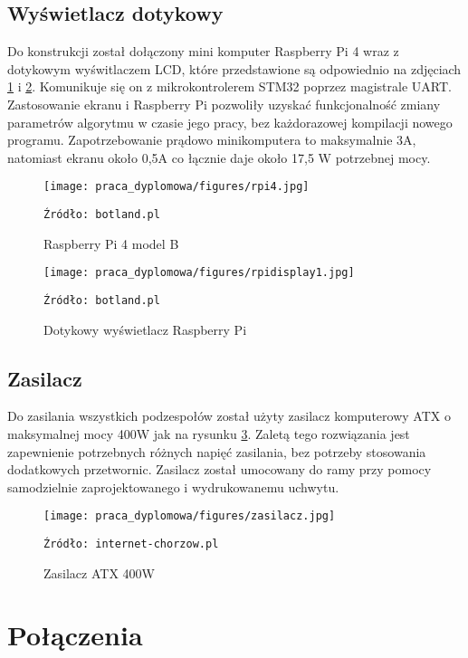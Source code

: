 \subsection{Wyświetlacz dotykowy}
Do konstrukcji został dołączony mini komputer Raspberry Pi 4 wraz z dotykowym wyświtlaczem LCD, które przedstawione są odpowiednio na zdjęciach \ref{fig:rpi4} i \ref{fig:rpidisp1}. Komunikuje się on z mikrokontrolerem STM32 poprzez magistrale UART. Zastosowanie ekranu i Raspberry Pi pozwoliły uzyskać funkcjonalność zmiany parametrów algorytmu w czasie jego pracy, bez każdorazowej kompilacji nowego programu. Zapotrzebowanie prądowo minikomputera to maksymalnie 3A, natomiast ekranu około 0,5A co łącznie daje około 17,5 W potrzebnej mocy. 

\begin{figure}
    \centering
    \texttt{[image: praca\_dyplomowa/figures/rpi4.jpg]}
    \caption{Raspberry Pi 4 model B}
    \texttt{Źródło: botland.pl}
    \label{fig:rpi4}
\end{figure}

\begin{figure}
    \centering
    \texttt{[image: praca\_dyplomowa/figures/rpidisplay1.jpg]}
    \caption{Dotykowy wyświetlacz Raspberry Pi}
    \texttt{Źródło: botland.pl}
    \label{fig:rpidisp1}
\end{figure}


\subsection{Zasilacz}
Do zasilania wszystkich podzespołów został użyty zasilacz komputerowy ATX o maksymalnej mocy 400W jak na rysunku \ref{fig:zasilacz}. Zaletą tego rozwiązania jest zapewnienie potrzebnych różnych napięć zasilania, bez potrzeby stosowania dodatkowych przetwornic. Zasilacz został umocowany do ramy przy pomocy samodzielnie zaprojektowanego i wydrukowanemu uchwytu.

\begin{figure}
    \centering
    \texttt{[image: praca\_dyplomowa/figures/zasilacz.jpg]}
    \caption{Zasilacz ATX 400W}
    \texttt{Źródło: internet-chorzow.pl}
    \label{fig:zasilacz}
\end{figure}

\section{Połączenia}

